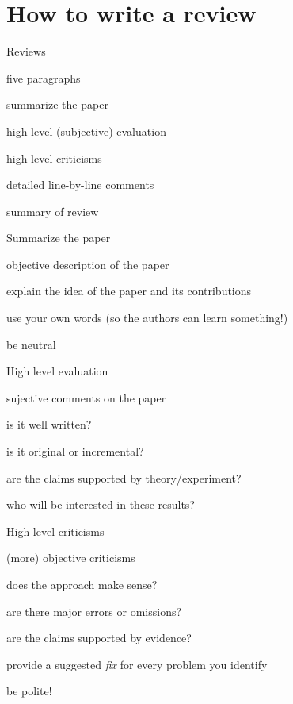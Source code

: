 \documentclass[presentation,xcolor={usenames,dvipsnames}]{beamer}
\begin{document}
\section{How to write a review}

\begin{frame}{Reviews}

five paragraphs
\bit
\item summarize the paper
\item high level (subjective) evaluation
\item high level criticisms
\item detailed line-by-line comments
\item summary of review
\eit

\end{frame}

\begin{frame}{Summarize the paper}

objective description of the paper
\bit
\item explain the idea of the paper and its contributions
\item use your own words (so the authors can learn something!)
\item be neutral
\eit

\end{frame}

\begin{frame}{High level evaluation}

sujective comments on the paper
\bit
\item is it well written?
\item is it original or incremental?
\item are the claims supported by theory/experiment?
\item who will be interested in these results?
\eit

\end{frame}

\begin{frame}{High level criticisms}

(more) objective criticisms
\bit
\item does the approach make sense?
\item are there major errors or omissions?
\item are the claims supported by evidence?
\item provide a suggested \emph{fix} for every problem you identify
\item be polite!
\eit

\end{frame}
\end{document}
